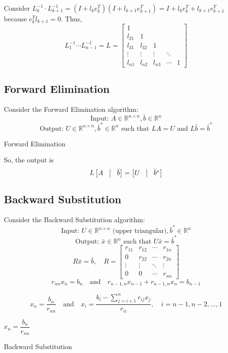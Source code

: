 \documentclass[11pt]{article}
\begin{document}
Consider \(L_k^{-1} \cdot L_{k+1}^{-1} = (I + l_k e_k^T)(I + l_{k+1} e_{k+1}^T) = I + l_k e_k^T + l_{k+1} e_{k+1}^T\) because \(e_k^T l_{k+1} = 0\). Thus,
\[L_1^{-1} \cdots L_{n-1}^{-1} = L = \begin{bmatrix}
    1 & & & & \\
    l_{21} & 1 & & & \\
    l_{31} & l_{32} & 1 & & \\
    \vdots & \vdots & \vdots & \ddots & \\
    l_{n1} & l_{n2} & l_{n3} & \cdots & 1
\end{bmatrix} \]

\subsection{Forward Elimination}
Consider the Forward Elimination algorithm:
\[\text{Input: } A \in \mathbb{R}^{n \times n}, \bar{b} \in \mathbb{R}^n\]
\[\text{Output: } U \in \mathbb{R}^{n \times n}, \bar{b}^* \in \mathbb{R}^n \text{ such that } L A = U \text{ and } L \bar{b} = \bar{b}^*\]

\begin{algorithm}[H]
\caption{Forward Elimination}
\end{algorithm}
\vskip 0.5cm
So, the output is
\[L \begin{bmatrix}
    A & \vline & \bar{b} 
\end{bmatrix} = \begin{bmatrix}
    U & \vline & \bar{b}^*
\end{bmatrix}
\]

\subsection{Backward Substitution}
Consider the Backward Substitution algorithm:
\[\text{Input: } U \in \mathbb{R}^{n \times n} \text{ (upper triangular)}, \bar{b}^* \in \mathbb{R}^n\]
\[\text{Output: } \bar{x} \in \mathbb{R}^n \text{ such that } U \bar{x} = \bar{b}^*\]
\[R \bar{x} = \bar{b}, \quad R = \begin{bmatrix}
    r_{11} & r_{12} & \cdots & r_{1n} \\
    0 & r_{22} & \cdots & r_{2n} \\
    \vdots & \vdots & \ddots & \vdots \\
    0 & 0 & \cdots & r_{nn}
\end{bmatrix}\]
\[r_{nn} x_n = b_n \quad \text{and} \quad r_{n-1, n} x_{n-1} + r_{n-1, n} x_n = b_{n-1}\]

\[ x_n = \frac{b_n}{r_{nn}} \quad \text{and} \quad x_i = \frac{b_i - \sum_{j=i+1}^{n} r_{ij} x_j}{r_{ii}}, \quad i = n-1, n-2, \ldots, 1\]
\begin{algorithm}[H]
$x_n = \dfrac{b_n}{r_{nn}}$\;
\caption{Backward Substitution}
\end{algorithm}
\end{document}
